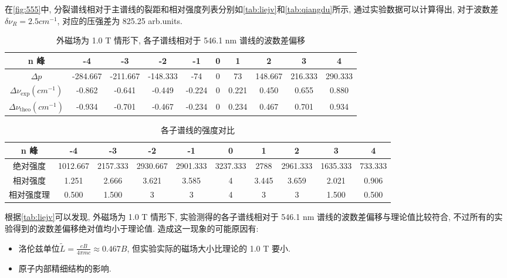 \documentclass[font=default]{mpltx}
\begin{document}
在\autoref{fig:555}中, 分裂谱线相对于主谱线的裂距和相对强度列表分别如\autoref{tab:liejv}和\autoref{tab:qiangdu}所示,
通过实验数据可以计算得出, 对于波数差$\delta \nu_R = 2.5 cm^{-1}$, 对应的压强差为 825.25 arb.units.


\begin{table}[htbp]
  \centering
  \caption{外磁场为 1.0 T 情形下, 各子谱线相对于 546.1 nm 谱线的波数差偏移}
  \begin{tabular}{c|ccccccccc}
    \hline
    n 峰 & -4 & -3 & -2 & -1 & 0 & 1 & 2 & 3 & 4 \\
    \hline
    $\Delta p$ & -284.667 & -211.667 & -148.333 & -74 & 0 & 73 & 148.667 & 216.333 & 290.333 \\
    \hline
    $\Delta \nu_{\text{exp}} (cm^{-1})$ & -0.862 & -0.641 & -0.449 & -0.224 & 0 & 0.221 & 0.450 & 0.655 & 0.880 \\
    \hline
    $\Delta \nu_{\text{theo}} (cm^{-1})$ & -0.934 & -0.701 & -0.467 & -0.234 & 0 & 0.234 & 0.467 & 0.701 & 0.934 \\
    \hline
  \end{tabular}
  \label{tab:liejv}
\end{table}

\begin{table}[htbp]
  \centering
  \caption{各子谱线的强度对比}
  \begin{tabular}{c|ccccccccc}
    \hline
    n 峰 & -4 & -3 & -2 & -1 & 0 & 1 & 2 & 3 & 4 \\
    \hline
    绝对强度 & 1012.667 & 2157.333 & 2930.667 & 2901.333 & 3237.333 & 2788 & 2961.333 & 1635.333 & 733.333 \\
    \hline
    相对强度 & 1.251 & 2.666 & 3.621 & 3.585 & 4 & 3.445 & 3.659 & 2.021 & 0.906 \\
    \hline
    相对强度理 & 0.500 & 1.500 & 3 & 3 & 4 & 3 & 3 & 1.500 & 0.500 \\
    \hline
  \end{tabular}
  \label{tab:qiangdu}
\end{table}

根据\autoref{tab:liejv}可以发现, 外磁场为 1.0 T 情形下, 
实验测得的各子谱线相对于 546.1 nm 谱线的波数差偏移与理论值比较符合, 不过所有的实验得到的波数差偏移绝对值均小于理论值.
造成这一现象的可能原因有:
\begin{itemize}
  \item 洛伦兹单位$\tilde{L} = \frac{eB}{4\pi mc} \approx 0.467B$, 但实验实际的磁场大小比理论的 1.0 T 要小.
  \item 原子内部精细结构的影响.
\end{itemize}
\end{document}
